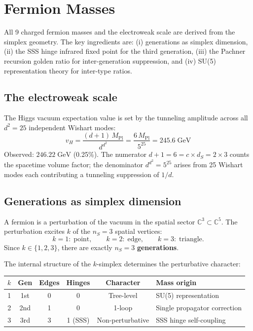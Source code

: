 \section{Fermion Masses}
\label{ch:masses}

All 9 charged fermion masses and the electroweak scale are derived from the simplex geometry. The key ingredients are: (i) generations as simplex dimension, (ii) the SSS hinge infrared fixed point for the third generation, (iii) the Pachner recursion golden ratio for inter-generation suppression, and (iv) SU(5) representation theory for inter-type ratios.

\subsection{The electroweak scale}

The Higgs vacuum expectation value is set by the tunneling amplitude across all $d^2 = 25$ independent Wishart modes:
\begin{equation}
\boxed{v_H = \frac{(d+1)\,M_\text{Pl}}{d^{d^2}} = \frac{6\,M_\text{Pl}}{5^{25}} = 245.6\;\text{GeV}}
\end{equation}
Observed: $246.22\;\text{GeV}$ (0.25\%). The numerator $d + 1 = 6 = c \times d_S = 2 \times 3$ counts the spacetime volume factor; the denominator $d^{d^2} = 5^{25}$ arises from 25 Wishart modes each contributing a tunneling suppression of $1/d$.

\subsection{Generations as simplex dimension}

A fermion is a perturbation of the vacuum in the spatial sector $\mathbb{C}^3 \subset \mathbb{C}^5$. The perturbation excites $k$ of the $n_S = 3$ spatial vertices:
\begin{equation}
k = 1:\;\text{point}, \qquad k = 2:\;\text{edge}, \qquad k = 3:\;\text{triangle}.
\end{equation}
Since $k \in \{1, 2, 3\}$, there are exactly $n_S = 3$ \textbf{generations}.

The internal structure of the $k$-simplex determines the perturbative character:

\begin{center}
\begin{tabular}{cccccl}
\hline
$k$ & Gen & Edges & Hinges & Character & Mass origin \\
\hline
1 & 1st & 0 & 0 & Tree-level & SU(5) representation \\
2 & 2nd & 1 & 0 & 1-loop & Single propagator correction \\
3 & 3rd & 3 & 1 (SSS) & Non-perturbative & SSS hinge self-coupling \\
\hline
\end{tabular}
\end{center}

